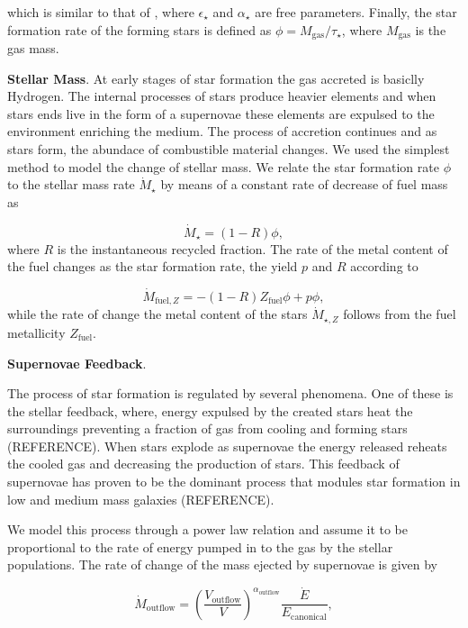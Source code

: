 \documentclass[usenatbib]{mn2e}
\begin{document}
which is similar to that of \cite{2005MNRAS.356.1191B}, where
$\epsilon_{\star}$ and $\alpha_\star$ are free parameters. Finally,
the star formation rate of the forming stars is defined as
$\phi=M_{\text{gas}}/\tau_{\star}$, where $M_{\text{gas}}$ is the gas
mass. 

\textbf{Stellar Mass}. At early stages of star formation the gas
accreted  is basiclly Hydrogen. The internal processes of stars
produce heavier elements and when stars ends live in the form of a
supernovae these elements are expulsed to the environment enriching
the medium. The process of accretion continues and as stars form, the
abundace of combustible material changes. We used the simplest method
to model the change of stellar mass. We relate the star formation rate
$\phi$  to the stellar mass rate $\dot{M}_{\star}$ by  means of a
constant rate of decrease of fuel mass as 

\begin{equation}
 \dot{M}_{\star}=(1-R)\phi,
\end{equation}
where $R$ is the instantaneous recycled fraction. The rate of the
metal content of the fuel changes as the star formation rate, the
yield $p$ and $R$  according  to

\begin{equation}  
 \dot{M}_{\text{fuel},Z}=-(1-R)Z_{\text{fuel}}\phi+p\phi,
\end{equation}
while the rate of change the metal content of the stars
$\dot{M}_{\star, Z}$ follows from the fuel metallicity
$Z_{\text{fuel}}$. 


\textbf{Supernovae Feedback}. 

The process of star formation is regulated by several phenomena. One
of these is the stellar feedback, where, energy expulsed by the
created stars heat the surroundings preventing a fraction of gas from
cooling and forming stars (REFERENCE). When stars explode as
supernovae the energy released reheats the cooled gas and decreasing
the production of stars. This feedback of supernovae has proven to be
the dominant process that modules star formation in low and medium
mass galaxies (REFERENCE). 

We model this process through a power law relation and  assume it to
be  proportional to the rate of energy pumped in to the gas by the
stellar populations. The rate of change of the mass ejected  by
supernovae is given by 

\begin{equation}
 \dot{M}_{\text{outflow}}=\left( \frac{V_{\text{outflow}}}{V} \right)^{\alpha_{\text{outflow}}}\frac{\dot{E}}{E_{\text{canonical}}}, \label{eq:supernovae}
\end{equation}
\end{document}
